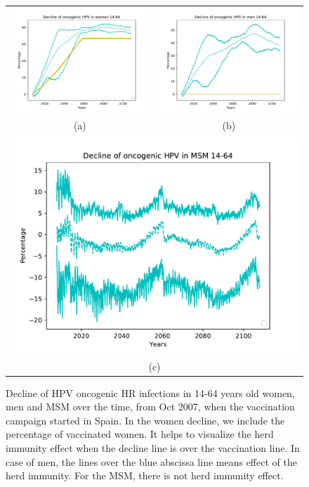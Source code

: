 \begin{figure}[!]
	\centering
	\begin{tabular}{cc}
		\includegraphics[width=0.5\linewidth]{IMGs/5.-Decline_onco/onco_muj.pdf}	& 
		\includegraphics[width=0.5\linewidth]{IMGs/5.-Decline_onco/onco_hom.pdf}  \\ 
		(a)	& (b) \\ 
		\multicolumn{2}{c}{ \includegraphics[width=0.5\linewidth]{IMGs/5.-Decline_onco/onco_MSM.pdf} } \\ 
		\multicolumn{2}{c}{(c)} \\ 
	\end{tabular} 
	\caption{Decline of HPV oncogenic HR infections in 14-64 years old women, men and MSM over the time, from Oct 2007, when the vaccination campaign started in Spain. In the women decline, we include the percentage of vaccinated women. It helps to visualize the herd immunity effect when the decline line is over the vaccination line. In case of men, the lines over the blue abscissa line means effect of the herd immunity. For the MSM, there is not herd immunity effect.}
	\label{fig:oncoESP}
\end{figure}

